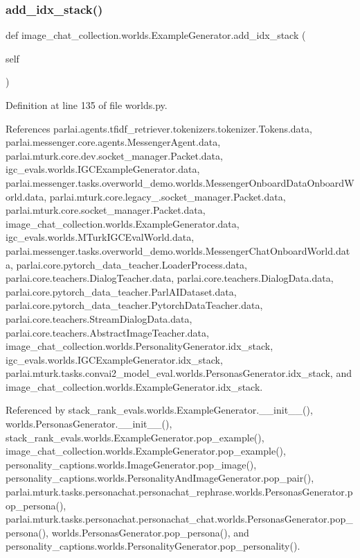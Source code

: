 \subsubsection{\texorpdfstring{add\+\_\+idx\+\_\+stack()}{add\_idx\_stack()}}
{\footnotesize\ttfamily def image\+\_\+chat\+\_\+collection.\+worlds.\+Example\+Generator.\+add\+\_\+idx\+\_\+stack (\begin{DoxyParamCaption}\item[{}]{self }\end{DoxyParamCaption})}



Definition at line 135 of file worlds.\+py.



References parlai.\+agents.\+tfidf\+\_\+retriever.\+tokenizers.\+tokenizer.\+Tokens.\+data, parlai.\+messenger.\+core.\+agents.\+Messenger\+Agent.\+data, parlai.\+mturk.\+core.\+dev.\+socket\+\_\+manager.\+Packet.\+data, igc\+\_\+evals.\+worlds.\+I\+G\+C\+Example\+Generator.\+data, parlai.\+messenger.\+tasks.\+overworld\+\_\+demo.\+worlds.\+Messenger\+Onboard\+Data\+Onboard\+World.\+data, parlai.\+mturk.\+core.\+legacy\+\_.\+socket\+\_\+manager.\+Packet.\+data, parlai.\+mturk.\+core.\+socket\+\_\+manager.\+Packet.\+data, image\+\_\+chat\+\_\+collection.\+worlds.\+Example\+Generator.\+data, igc\+\_\+evals.\+worlds.\+M\+Turk\+I\+G\+C\+Eval\+World.\+data, parlai.\+messenger.\+tasks.\+overworld\+\_\+demo.\+worlds.\+Messenger\+Chat\+Onboard\+World.\+data, parlai.\+core.\+pytorch\+\_\+data\+\_\+teacher.\+Loader\+Process.\+data, parlai.\+core.\+teachers.\+Dialog\+Teacher.\+data, parlai.\+core.\+teachers.\+Dialog\+Data.\+data, parlai.\+core.\+pytorch\+\_\+data\+\_\+teacher.\+Parl\+A\+I\+Dataset.\+data, parlai.\+core.\+pytorch\+\_\+data\+\_\+teacher.\+Pytorch\+Data\+Teacher.\+data, parlai.\+core.\+teachers.\+Stream\+Dialog\+Data.\+data, parlai.\+core.\+teachers.\+Abstract\+Image\+Teacher.\+data, image\+\_\+chat\+\_\+collection.\+worlds.\+Personality\+Generator.\+idx\+\_\+stack, igc\+\_\+evals.\+worlds.\+I\+G\+C\+Example\+Generator.\+idx\+\_\+stack, parlai.\+mturk.\+tasks.\+convai2\+\_\+model\+\_\+eval.\+worlds.\+Personas\+Generator.\+idx\+\_\+stack, and image\+\_\+chat\+\_\+collection.\+worlds.\+Example\+Generator.\+idx\+\_\+stack.



Referenced by stack\+\_\+rank\+\_\+evals.\+worlds.\+Example\+Generator.\+\_\+\+\_\+init\+\_\+\+\_\+(), worlds.\+Personas\+Generator.\+\_\+\+\_\+init\+\_\+\+\_\+(), stack\+\_\+rank\+\_\+evals.\+worlds.\+Example\+Generator.\+pop\+\_\+example(), image\+\_\+chat\+\_\+collection.\+worlds.\+Example\+Generator.\+pop\+\_\+example(), personality\+\_\+captions.\+worlds.\+Image\+Generator.\+pop\+\_\+image(), personality\+\_\+captions.\+worlds.\+Personality\+And\+Image\+Generator.\+pop\+\_\+pair(), parlai.\+mturk.\+tasks.\+personachat.\+personachat\+\_\+rephrase.\+worlds.\+Personas\+Generator.\+pop\+\_\+persona(), parlai.\+mturk.\+tasks.\+personachat.\+personachat\+\_\+chat.\+worlds.\+Personas\+Generator.\+pop\+\_\+persona(), worlds.\+Personas\+Generator.\+pop\+\_\+persona(), and personality\+\_\+captions.\+worlds.\+Personality\+Generator.\+pop\+\_\+personality().

